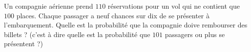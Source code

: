 
\begin{exercice}\label{exoPremiere-0091}

    Un compagnie aérienne prend \( 110\) réservations pour un vol qui ne contient que \( 100\) places. Chaque passager a neuf chances sur dix de se présenter à l'embarquement. Quelle est la probabilité que la compagnie doive rembourser des billets ? (c'est à dire quelle est la probabilité que \( 101\) passagers ou plus se présentent ?)

\end{exercice}
